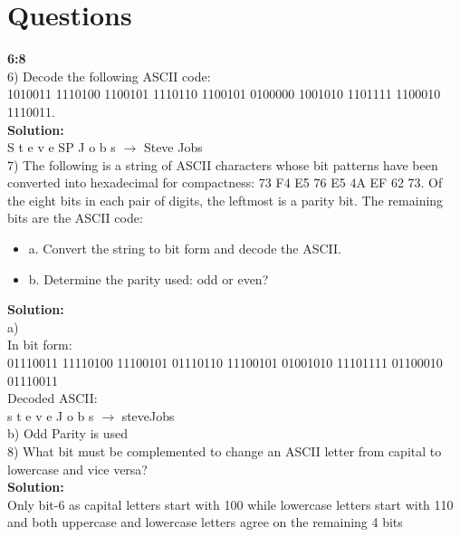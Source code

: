 \documentclass[a4paper,12pt]{extarticle}
\begin{document}
\section*{\LARGE Questions }{\textbf{\LARGE 6:8}}\\[0.5cm]
\color{black} 6) Decode the following ASCII code:\\
1010011 1110100 1100101 1110110 1100101 0100000 1001010 1101111 1100010 1110011.\\[0.3cm]
{\color{blue}\textbf{Solution:}}\\[0.3cm]
S t e v e SP J o b s $\rightarrow$ Steve Jobs\\[1cm]
7) The following is a string of ASCII characters whose bit patterns have been converted into
hexadecimal for compactness: 73 F4 E5 76 E5 4A EF 62 73. Of the eight bits in each pair
of digits, the leftmost is a parity bit. The remaining bits are the ASCII code:
\begin{itemize}
\item a. Convert the string to bit form and decode the ASCII.
\item b. Determine the parity used: odd or even?
\end{itemize}
{\color{blue}\textbf{Solution:}}\\[0.3cm]
\color{red} a) \color{black}\\ In bit form:\\ 01110011 11110100 11100101 01110110 11100101 01001010 11101111 01100010 01110011\\
Decoded ASCII:\\ s t e v e J o b s $\rightarrow$ steveJobs\\
\color{red} b) \color{black} Odd Parity is used\\[1cm]
8) What bit must be complemented to change an ASCII letter from capital to lowercase and vice versa?\\
{\color{blue}\textbf{Solution:}}\\[0.3cm]
Only bit-6 as capital letters start with 100 while lowercase letters start with 110 and both uppercase and lowercase letters agree on the remaining 4 bits
\newpage
\end{document}
